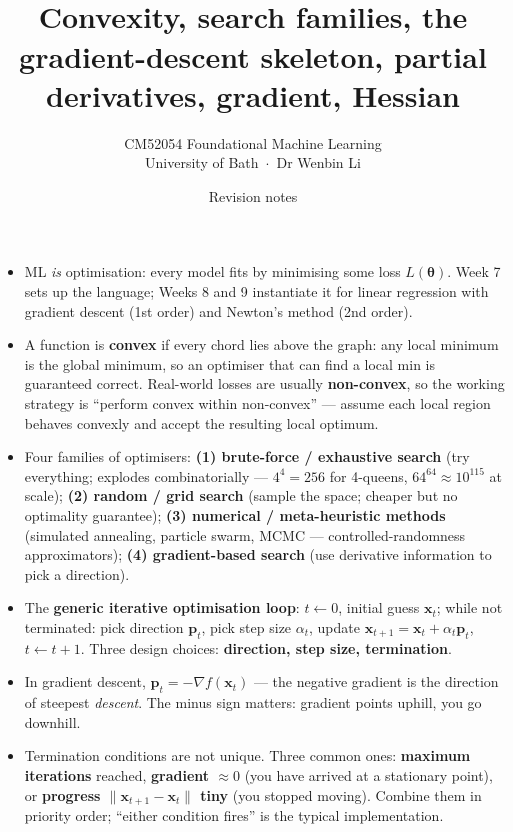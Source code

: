 \documentclass[11pt, a4paper]{article}
\title{\vspace{-1cm}{\Huge\bfseries Week 7 — Optimisation Basics 1} \\[0.4em]{\large Convexity, search families, the gradient-descent skeleton, partial derivatives, gradient, Hessian}}
\author{\large CM52054 Foundational Machine Learning \\[0.2em]\normalsize University of Bath \,$\cdot$\, Dr Wenbin Li}
\date{Revision notes}
\begin{document}
\maketitle
\thispagestyle{empty}

\vspace{1em}

\begin{tldrbox}
\begin{itemize}[leftmargin=*]
  \item ML \emph{is} optimisation: every model fits by minimising some loss $L(\boldsymbol\theta)$. Week 7 sets up the language; Weeks 8 and 9 instantiate it for linear regression with gradient descent (1st order) and Newton's method (2nd order).
  \item A function is \textbf{convex} if every chord lies above the graph: any local minimum is the global minimum, so an optimiser that can find a local min is guaranteed correct. Real-world losses are usually \textbf{non-convex}, so the working strategy is ``perform convex within non-convex'' — assume each local region behaves convexly and accept the resulting local optimum.
  \item Four families of optimisers: \textbf{(1) brute-force / exhaustive search} (try everything; explodes combinatorially — $4^4 = 256$ for 4-queens, $64^{64}\!\approx\!10^{115}$ at scale); \textbf{(2) random / grid search} (sample the space; cheaper but no optimality guarantee); \textbf{(3) numerical / meta-heuristic methods} (simulated annealing, particle swarm, MCMC — controlled-randomness approximators); \textbf{(4) gradient-based search} (use derivative information to pick a direction).
  \item The \textbf{generic iterative optimisation loop}: $t \leftarrow 0$, initial guess $\mathbf{x}_t$; while not terminated: pick direction $\mathbf{p}_t$, pick step size $\alpha_t$, update $\mathbf{x}_{t+1} = \mathbf{x}_t + \alpha_t\mathbf{p}_t$, $t \leftarrow t+1$. Three design choices: \textbf{direction, step size, termination}.
  \item In gradient descent, $\mathbf{p}_t = -\nabla f(\mathbf{x}_t)$ — the negative gradient is the direction of steepest \emph{descent}. The minus sign matters: gradient points uphill, you go downhill.
  \item Termination conditions are not unique. Three common ones: \textbf{maximum iterations} reached, \textbf{gradient $\approx 0$} (you have arrived at a stationary point), or \textbf{progress $\|\mathbf{x}_{t+1} - \mathbf{x}_t\|$ tiny} (you stopped moving). Combine them in priority order; ``either condition fires'' is the typical implementation.

\end{itemize}
\end{tldrbox}
\end{document}
